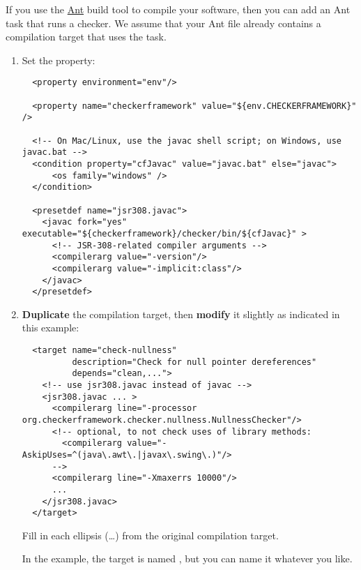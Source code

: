 If you use the \href{http://ant.apache.org/}{Ant} build tool to compile
your software, then you can add an Ant task that runs a checker.  We assume
that your Ant file already contains a compilation target that uses the
 task.

\begin{enumerate}
\item
Set the  property:

\begin{smaller}
\begin{Verbatim}
  <property environment="env"/>

  <property name="checkerframework" value="${env.CHECKERFRAMEWORK}" />

  <!-- On Mac/Linux, use the javac shell script; on Windows, use javac.bat -->
  <condition property="cfJavac" value="javac.bat" else="javac">
      <os family="windows" />
  </condition>

  <presetdef name="jsr308.javac">
    <javac fork="yes" executable="${checkerframework}/checker/bin/${cfJavac}" >
      <!-- JSR-308-related compiler arguments -->
      <compilerarg value="-version"/>
      <compilerarg value="-implicit:class"/>
    </javac>
  </presetdef>
\end{Verbatim}
\end{smaller}

\item \textbf{Duplicate} the compilation target, then \textbf{modify} it slightly as
indicated in this example:

\begin{smaller}
\begin{Verbatim}
  <target name="check-nullness"
          description="Check for null pointer dereferences"
          depends="clean,...">
    <!-- use jsr308.javac instead of javac -->
    <jsr308.javac ... >
      <compilerarg line="-processor org.checkerframework.checker.nullness.NullnessChecker"/>
      <!-- optional, to not check uses of library methods:
        <compilerarg value="-AskipUses=^(java\.awt\.|javax\.swing\.)"/>
      -->
      <compilerarg line="-Xmaxerrs 10000"/>
      ...
    </jsr308.javac>
  </target>
\end{Verbatim}
\end{smaller}

Fill in each ellipsis (\ldots) from the original compilation target.

In the example, the target is named , but you can
name it whatever you like.
\end{enumerate}

